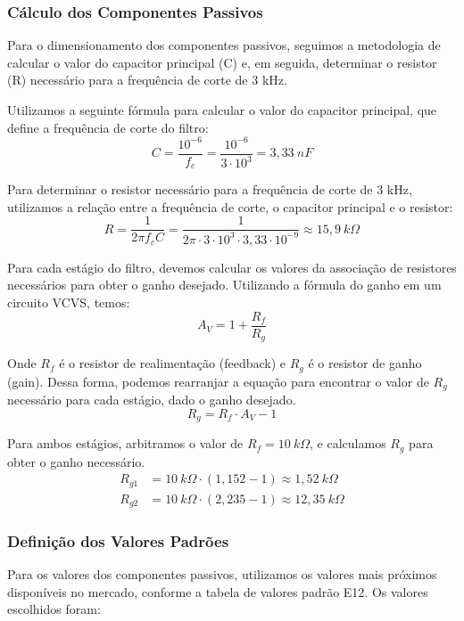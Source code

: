 \subsubsection{Cálculo dos Componentes Passivos}
Para o dimensionamento dos componentes passivos, seguimos a metodologia de calcular o valor do capacitor principal (C) e, em seguida, determinar o resistor (R) necessário para a frequência de corte de 3 kHz.

Utilizamos a seguinte fórmula para calcular o valor do capacitor principal, que define a frequência de corte do filtro:
\begin{equation}
    C = \frac{10^{-6}}{f_c} = \frac{10^{-6}}{3 \cdot 10^3} = 3,33~nF
\end{equation}

Para determinar o resistor necessário para a frequência de corte de 3 kHz, utilizamos a relação entre a frequência de corte, o capacitor principal e o resistor:
\begin{equation}
    R = \frac{1}{2 \pi f_c C} = \frac{1}{2 \pi \cdot 3 \cdot 10^3 \cdot 3,33 \cdot 10^{-9}} \approx 15,9~k\Omega
\end{equation}

Para cada estágio do filtro, devemos calcular os valores da associação de resistores necessários para obter o ganho desejado. Utilizando a fórmula do ganho em um circuito VCVS, temos:
\begin{equation}
    A_V = 1 + \frac{R_f}{R_g}
\end{equation}

Onde $R_f$ é o resistor de realimentação (feedback) e $R_g$ é o resistor de ganho (gain). Dessa forma, podemos rearranjar a equação para encontrar o valor de $R_g$ necessário para cada estágio, dado o ganho desejado.
\begin{equation}
    R_g = {R_f} \cdot {A_V - 1}
\end{equation}

Para ambos estágios, arbitramos o valor de $R_f = 10~k\Omega$, e calculamos $R_g$ para obter o ganho necessário.
\begin{align}
    R_{g1} &= 10~k\Omega \cdot (1,152 - 1) \approx 1,52~k\Omega \\
    R_{g2} &= 10~k\Omega \cdot (2,235 - 1) \approx 12,35~k\Omega
\end{align}

\subsubsection{Definição dos Valores Padrões}
Para os valores dos componentes passivos, utilizamos os valores mais próximos disponíveis no mercado, conforme a tabela de valores padrão E12. Os valores escolhidos foram:

